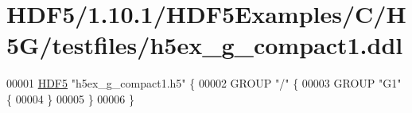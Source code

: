 \hypertarget{_h_d_f5_21_810_81_2_h_d_f5_examples_2_c_2_h5_g_2testfiles_2h5ex__g__compact1_8ddl_source}{}\section{H\+D\+F5/1.10.1/\+H\+D\+F5\+Examples/\+C/\+H5\+G/testfiles/h5ex\+\_\+g\+\_\+compact1.ddl}
\label{_h_d_f5_21_810_81_2_h_d_f5_examples_2_c_2_h5_g_2testfiles_2h5ex__g__compact1_8ddl_source}

\begin{DoxyCode}
00001 \hyperlink{namespace_h_d_f5}{HDF5} \textcolor{stringliteral}{"h5ex\_g\_compact1.h5"} \{
00002 GROUP \textcolor{stringliteral}{"/"} \{
00003    GROUP \textcolor{stringliteral}{"G1"} \{
00004    \}
00005 \}
00006 \}
\end{DoxyCode}
